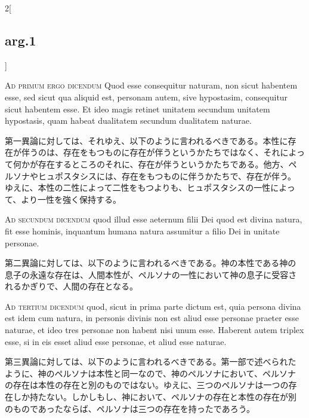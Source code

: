 \documentclass[paper=a4paper,fontsize=10pt,jafontsize=9pt,titlepage]{jlreq}
\begin{document}
\begin{paracol}{2}[\subsection{arg.1}]
\switchcolumn*[\subsection{ad.1}]

{\scshape Ad primum ergo dicendum} Quod esse consequitur naturam, non
sicut habentem esse, sed sicut qua aliquid est, personam autem, sive
hypostasim, consequitur sicut habentem esse. Et ideo magis retinet
unitatem secundum unitatem hypostasis, quam habeat dualitatem secundum
dualitatem naturae.

\switchcolumn

第一異論に対しては、それゆえ、以下のように言われるべきである。本性に存
在が伴うのは、存在をもつものに存在が伴うというかたちではなく、それによっ
て何かが存在するところのそれに、存在が伴うというかたちである。他方、ペ
ルソナやヒュポスタシスには、存在をもつものに伴うかたちで、存在が伴う。
ゆえに、本性の二性によって二性をもつよりも、ヒュポスタシスの一性によっ
て、より一性を強く保持する。

\switchcolumn*[\subsection{ad.2}]

{\scshape Ad secundum dicendum} quod illud esse aeternum filii Dei
quod est divina natura, fit esse hominis, inquantum humana natura
assumitur a filio Dei in unitate personae.

\switchcolumn

第二異論に対しては、以下のように言われるべきである。神の本性である神の
息子の永遠な存在は、人間本性が、ペルソナの一性において神の息子に受容さ
れるかぎりで、人間の存在となる。

\switchcolumn*[\subsection{ad.3}]

{\scshape Ad tertium dicendum} quod, sicut in prima parte dictum est,
quia persona divina est idem cum natura, in personis divinis non est
aliud esse personae praeter esse naturae, et ideo tres personae non
habent nisi unum esse. Haberent autem triplex esse, si in eis esset
aliud esse personae, et aliud esse naturae.

\switchcolumn

第三異論に対しては、以下のように言われるべきである。第一部で述べられた
ように、神のペルソナは本性と同一なので、神のペルソナにおいて、ペルソナ
の存在は本性の存在と別のものではない。ゆえに、三つのペルソナは一つの存
在しか持たない。しかしもし、神において、ペルソナの存在と本性の存在が別
のものであったならば、ペルソナは三つの存在を持ったであろう。


\end{paracol}
\end{document}
